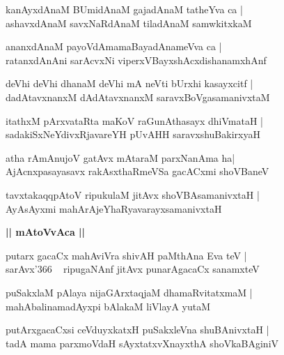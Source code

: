 \documentclass[twoside,12pt,openright]{book}
\newcounter{shloka}[chapter]
\def\uvaca#1{\centerline{{\large\textbf{#1}}}}
\begin{document}
\begin{shloka}%
kanAyxdAnaM BUmidAnaM gajadAnaM tatheYva ca |\\
ashavxdAnaM savxNaRdAnaM tiladAnaM samwkitxkaM
\end{shloka}

\begin{shloka}%
ananxdAnaM payoVdAmamaBayadAnameVva ca |\\
ratanxdAnAni sarAcvxNi viperxVBayxshAcxdishanamxhAnf 
\end{shloka}

\begin{shloka}%
deVhi deVhi dhanaM deVhi mA neVti bUrxhi kasayxcitf |\\
dadAtavxnanxM dAdAtavxnanxM saravxBoVgasamanivxtaM 
\end{shloka}

\begin{shloka}%
itathxM pArxvataRta maKoV raGunAthasayx dhiVmataH |\\
sadakiSxNeYdivxRjavareYH pUvAHH saravxshuBakirxyaH
\end{shloka}

\begin{shloka}%
atha rAmAnujoV gatAvx mAtaraM parxNanAma ha|\\
AjAcnxpasayasavx rakAsxthaRmeVSa gacACxmi shoVBaneV 
\end{shloka}

\begin{shloka}%
tavxtakaqqpAtoV ripukulaM jitAvx shoVBAsamanivxtaH |\\
AyAsAyxmi mahArAjeYhaRyavarayxsamanivxtaH 
\end{shloka}

\uvaca{|| mAtoVvAca ||}

\begin{shloka}%
putarx gacaCx mahAviVra shivAH paMthAna Eva teV |\\
sarAvx\char'366 ~ ripugaNAnf jitAvx punarAgacaCx sanamxteV 
\end{shloka}

\begin{shloka}%
puSakxlaM  pAlaya nijaGArxtaqjaM dhamaRvitatxmaM |\\
mahAbalinamadAyxpi bAlakaM liVlayA yutaM 
\end{shloka}

\begin{shloka}%
putArxgacaCxsi ceVduyxkatxH puSakxleVna shuBAnivxtaH |\\
tadA mama parxmoVdaH sAyxtatxvXnayxthA shoVkaBAginiV  
\end{shloka}
\end{document}
